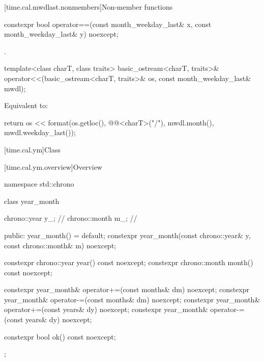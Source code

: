 [time.cal.mwdlast.nonmembers]{Non-member functions}

%
\begin{itemdecl}
constexpr bool operator==(const month_weekday_last& x, const month_weekday_last& y) noexcept;
\end{itemdecl}

\begin{itemdescr}
\pnum
\returns
{}.
\end{itemdescr}

%
\begin{itemdecl}
template<class charT, class traits>
  basic_ostream<charT, traits>&
    operator<<(basic_ostream<charT, traits>& os, const month_weekday_last& mwdl);
\end{itemdecl}

\begin{itemdescr}
\pnum
\effects
Equivalent to:
\begin{codeblock}
return os << format(os.getloc(), @@<charT>("{}/{}"),
                    mwdl.month(), mwdl.weekday_last());
\end{codeblock}
\end{itemdescr}

[time.cal.ym]{Class }

[time.cal.ym.overview]{Overview}

\begin{codeblock}
namespace std::chrono {
  class year_month {
    chrono::year  y_;           // \expos
    chrono::month m_;           // \expos

  public:
    year_month() = default;
    constexpr year_month(const chrono::year& y, const chrono::month& m) noexcept;

    constexpr chrono::year  year()  const noexcept;
    constexpr chrono::month month() const noexcept;

    constexpr year_month& operator+=(const months& dm) noexcept;
    constexpr year_month& operator-=(const months& dm) noexcept;
    constexpr year_month& operator+=(const years& dy)  noexcept;
    constexpr year_month& operator-=(const years& dy)  noexcept;

    constexpr bool ok() const noexcept;
  };
}
\end{codeblock}

